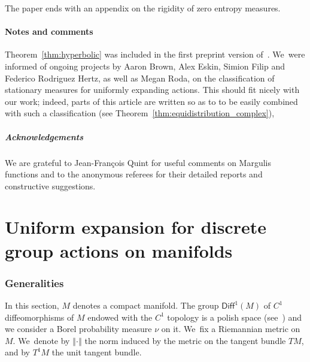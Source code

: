 \documentclass[JEP,XML,SOM,Unicode,published]{cedram}
\newcommand{\norm}[1]{{\left\Vert#1\right\Vert}}
\newcommand\Diff{{\mathsf{Diff}}}
\theoremstyle{plain}
\theoremstyle{definition}
\begin{document}
The paper ends with an appendix on the rigidity of zero entropy measures.\enlargethispage{.5\baselineskip}

\subsection{Notes and comments} Theorem~\ref{thm:hyperbolic} was included in the first preprint version
of~\cite{stiffness}. We~were informed of ongoing projects by Aaron Brown, Alex Eskin,
Simion Filip and Federico Rodriguez Hertz, as well as Megan Roda,
on the classification of stationary measures for uniformly expanding actions.
This should fit nicely with our work; indeed, parts of this article are written so as to to be easily combined with such a classification (see \eg Theorem~\ref{thm:equidistribution_complex}),

\subsubsection*{Acknowledgements}
We are grateful to Jean-François Quint for useful comments on Margulis functions and to
the anonymous referees for their detailed reports and constructive suggestions.

\part{Uniform expansion for discrete group actions on manifolds}

\section{Generalities}\label{sec:uniform_generalities}

In this section, $M$ denotes a compact manifold. The group $\Diff^1(M)$
of $C^1$ diffeomorphisms of $M$ endowed with the $C^1$ topology is a polish space (see~\cite{rosendal:book}) and we consider a Borel
probability measure $\nu$ on it. We~fix a Riemannian metric on $M$. We~denote by $\norm{\cdot}$
the norm induced by the metric on the tangent bundle $TM$, and by $T^1M$ the unit tangent bundle.
\end{document}
